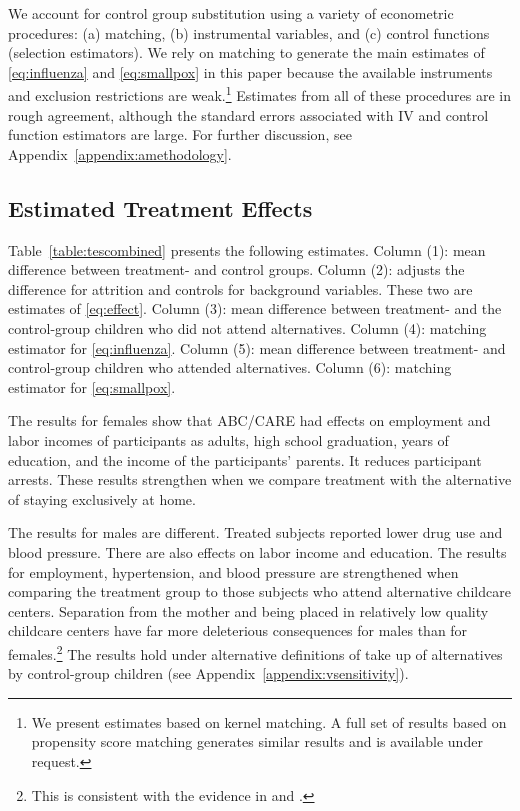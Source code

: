We account for control group substitution using a variety of econometric procedures: (a) matching, (b) instrumental variables, and (c) control functions (selection estimators). We rely on matching to generate the main estimates of \eqref{eq:influenza} and \eqref{eq:smallpox} in this paper because the available instruments and exclusion restrictions are weak.\footnote{We present estimates based on kernel matching. A full set of results based on propensity score matching generates similar results and is available under request.} Estimates from all of these procedures are in rough agreement, although the standard errors associated with IV and control function estimators are large. For further discussion, see Appendix~\ref{appendix:amethodology}.

\subsection{Estimated Treatment Effects}

Table~\ref{table:tescombined} presents the following estimates. Column (1): mean difference between treatment- and control groups. Column (2): adjusts the difference for attrition and controls for background variables. These two are estimates of \eqref{eq:effect}. Column (3): mean difference between treatment- and the control-group children who did not attend alternatives. Column (4): matching estimator for  \eqref{eq:influenza}. Column (5):  mean difference between treatment- and control-group children who attended alternatives. Column (6): matching estimator for \eqref{eq:smallpox}.

The results for females show that ABC/CARE had effects on employment and labor incomes of participants as adults, high school graduation, years of education, and the income of the participants' parents. It reduces participant arrests. These results strengthen when we compare treatment with the alternative of staying exclusively at home.

The results for males are different. Treated subjects reported lower drug use and blood pressure. There are also effects on labor income and education. The results for employment, hypertension, and blood pressure are strengthened when comparing the treatment group to those subjects who attend alternative childcare centers. Separation from the mother and being placed in relatively low quality childcare centers have far more deleterious consequences for males than for females.\footnote{This is consistent with the evidence in \citet{Baker_Gruber_Milligan_2015_Noncog_Defects} and \citet{Kottelenberg-Lehrer_2014_Gender-Effects}.} The results hold under alternative definitions of take up of alternatives by control-group children (see Appendix~\ref{appendix:vsensitivity}).

